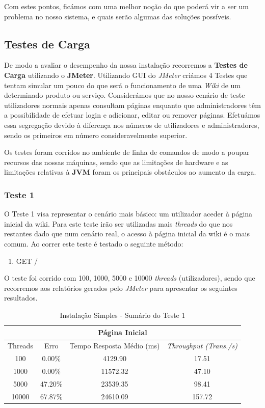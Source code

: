 Com estes pontos, ficámos com uma melhor noção do que poderá vir a ser um problema no nosso sistema, e quais serão algumas das soluções possíveis.

\subsection{Testes de Carga}

De modo a avaliar o desempenho da nossa instalação recorremos a \textbf{Testes de Carga} utilizando o \textbf{JMeter}. Utilizando GUI do \textit{JMeter} criámos 4 Testes que tentam simular um pouco do que será o funcionamento de uma \textit{Wiki} de um determinado produto ou serviço. Considerámos que no nosso cenário de teste utilizadores normais apenas consultam páginas enquanto que administradores têm a possibilidade de efetuar login e adicionar, editar ou remover páginas. Efetuámos essa segregação devido à diferença nos números de utilizadores e administradores, sendo os primeiros em número consideravelmente superior.

Os testes foram corridos no ambiente de linha de comandos de modo a poupar recursos das nossas máquinas, sendo que as limitações de hardware e as limitações relativas à \textbf{JVM} foram os principais obstáculos ao aumento da carga.

\subsubsection{Teste 1}

O Teste 1 visa representar o cenário mais básico: um utilizador aceder à página inicial da wiki. Para este teste irão ser utilizadas mais \textit{threads} do que nos restantes dado que num cenário real, o acesso à página inicial da wiki é o mais comum. Ao correr este teste é testado o seguinte método:

\begin{enumerate}
  \item GET /
\end{enumerate}

O teste foi corrido com 100, 1000, 5000 e 10000 \textit{threads} (utilizadores), sendo que recorremos aos relatórios gerados pelo \textit{JMeter} para apresentar os seguintes resultados. 

\begin{table}[h!]
\centering
    \begin{tabular}{ |c|c|c|c|  }
        \hline
        \multicolumn{4}{|c|}{Página Inicial} \\
        \hline
         Threads & Erro & Tempo Resposta Médio (ms) & \textit{Throughput (Trans./s)}\\
        \hline
        100   & 0.00\%   & 4129.90  & 17.51\\
        1000  & 0.00\%   & 11572.32 & 47.10\\
        5000  & 47.20\%  & 23539.35 & 98.41\\
        10000 & 67.87\%  & 24610.09 & 157.72\\
        \hline
    \end{tabular}
    \caption{Instalação Simples - Sumário do Teste 1}
    \label{table:1}
\end{table}

